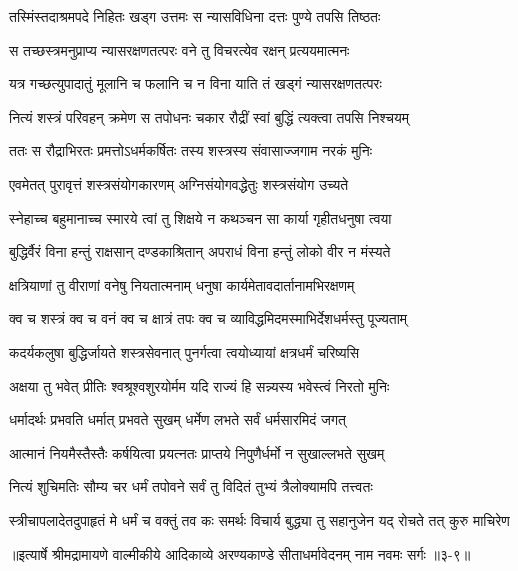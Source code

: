 \twolineshloka
{तस्मिंस्तदाश्रमपदे निहितः खड्ग उत्तमः}
{स न्यासविधिना दत्तः पुण्ये तपसि तिष्ठतः} %

\twolineshloka
{स तच्छस्त्रमनुप्राप्य न्यासरक्षणतत्परः}
{वने तु विचरत्येव रक्षन् प्रत्ययमात्मनः} %

\twolineshloka
{यत्र गच्छत्युपादातुं मूलानि च फलानि च}
{न विना याति तं खड्गं न्यासरक्षणतत्परः} %

\twolineshloka
{नित्यं शस्त्रं परिवहन् क्रमेण स तपोधनः}
{चकार रौद्रीं स्वां बुद्धिं त्यक्त्वा तपसि निश्चयम्} %

\twolineshloka
{ततः स रौद्राभिरतः प्रमत्तोऽधर्मकर्षितः}
{तस्य शस्त्रस्य संवासाज्जगाम नरकं मुनिः} %

\twolineshloka
{एवमेतत् पुरावृत्तं शस्त्रसंयोगकारणम्}
{अग्निसंयोगवद्धेतुः शस्त्रसंयोग उच्यते} %

\twolineshloka
{स्नेहाच्च बहुमानाच्च स्मारये त्वां तु शिक्षये}
{न कथञ्चन सा कार्या गृहीतधनुषा त्वया} %

\twolineshloka
{बुद्धिर्वैरं विना हन्तुं राक्षसान् दण्डकाश्रितान्}
{अपराधं विना हन्तुं लोको वीर न मंस्यते} %

\twolineshloka
{क्षत्रियाणां तु वीराणां वनेषु नियतात्मनाम्}
{धनुषा कार्यमेतावदार्तानामभिरक्षणम्} %

\twolineshloka
{क्व च शस्त्रं क्व च वनं क्व च क्षात्रं तपः क्व च}
{व्याविद्धमिदमस्माभिर्देशधर्मस्तु पूज्यताम्} %

\twolineshloka
{कदर्यकलुषा बुद्धिर्जायते शस्त्रसेवनात्}
{पुनर्गत्वा त्वयोध्यायां क्षत्रधर्मं चरिष्यसि} %

\twolineshloka
{अक्षया तु भवेत् प्रीतिः श्वश्रूश्वशुरयोर्मम}
{यदि राज्यं हि सन्न्यस्य भवेस्त्वं निरतो मुनिः} %

\twolineshloka
{धर्मादर्थः प्रभवति धर्मात् प्रभवते सुखम्}
{धर्मेण लभते सर्वं धर्मसारमिदं जगत्} %

\twolineshloka
{आत्मानं नियमैस्तैस्तैः कर्षयित्वा प्रयत्नतः}
{प्राप्तये निपुणैर्धर्मो न सुखाल्लभते सुखम्} %

\twolineshloka
{नित्यं शुचिमतिः सौम्य चर धर्मं तपोवने}
{सर्वं तु विदितं तुभ्यं त्रैलोक्यामपि तत्त्वतः} %

\twolineshloka
{स्त्रीचापलादेतदुपाहृतं मे धर्मं च वक्तुं तव कः समर्थः}
{विचार्य बुद्ध्या तु सहानुजेन यद् रोचते तत् कुरु माचिरेण} %


॥इत्यार्षे श्रीमद्रामायणे वाल्मीकीये आदिकाव्ये अरण्यकाण्डे सीताधर्मावेदनम् नाम नवमः सर्गः ॥३-९॥
